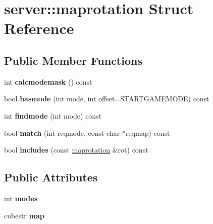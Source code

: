 \hypertarget{structserver_1_1maprotation}{}\section{server\+:\+:maprotation Struct Reference}
\label{structserver_1_1maprotation}
\subsection*{Public Member Functions}
\begin{DoxyCompactItemize}
\item 
\mbox{\label{structserver_1_1maprotation_ac17ad414f52d29cac2c00825a588dcc1}} 
int {\bfseries calcmodemask} () const
\item 
\mbox{\label{structserver_1_1maprotation_aca7120b131ee2b616a2b1afb9afbd183}} 
bool {\bfseries hasmode} (int mode, int offset=S\+T\+A\+R\+T\+G\+A\+M\+E\+M\+O\+DE) const
\item 
\mbox{\label{structserver_1_1maprotation_ab42002cbdfaf9c22fdab7c8cf60e5980}} 
int {\bfseries findmode} (int mode) const
\item 
\mbox{\label{structserver_1_1maprotation_a2f81efc5fd0575cf93df99d34c6e2158}} 
bool {\bfseries match} (int reqmode, const char $\ast$reqmap) const
\item 
\mbox{\label{structserver_1_1maprotation_a6e2d5bcdab7b7ed8a88ef32c8fc82a14}} 
bool {\bfseries includes} (const \hyperlink{structserver_1_1maprotation}{maprotation} \&rot) const
\end{DoxyCompactItemize}
\subsection*{Public Attributes}
\begin{DoxyCompactItemize}
\item 
\mbox{\label{structserver_1_1maprotation_a229ce3e84918e380edb6e1ba004aca49}} 
int {\bfseries modes}
\item 
\mbox{\label{structserver_1_1maprotation_aca7322856ea9af2bfec643941bb8b548}} 
cubestr {\bfseries map}
\end{DoxyCompactItemize}
